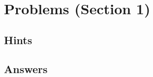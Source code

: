 

\pagestyle{fancy}%
\fancyhead[L]{\textsc{\rightmark}}%
\fancyhead[C]{}%
\fancyhead[R]{\thepage}
\fancyfoot{}%
\renewcommand{\contentsname}{Contents}%


\tableofcontents
\clearpage
\section{Problems (Section 1)}
\subsection{Hints}


\subsection{Answers}



